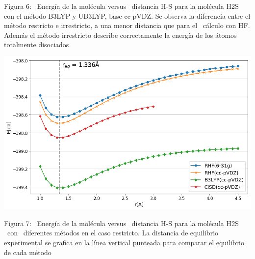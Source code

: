 \documentclass[]{article}
\begin{document}
{Figura 6: ~}{Energía de la molécula versus ~distancia H-S para la
molécula H}{2}{S con el método B3LYP y UB3LYP, base cc-pVDZ. Se observa
la diferencia entre el método restricto e irrestricto, a una menor
distancia que para el ~cálculo con HF. Además el método irrestricto
describe correctamente la energía de los átomos totalmente disociados}

{}

{\includegraphics{images/image6.png}}

{Figura 7}{: }{~}{Energía de la molécula versus ~distancia H-S para la
molécula H}{2}{S ~con ~diferentes métodos en el caso restricto. La
distancia de equilibrio experimental se grafica en la línea vertical
punteada para comparar el equilibrio de cada método}

{}
\end{document}
